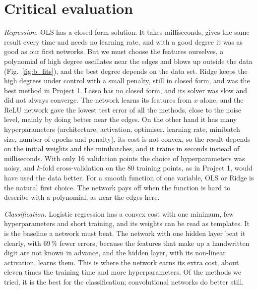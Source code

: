 
\section*{Critical evaluation}

\emph{Regression.} OLS has a closed-form solution. It takes milliseconds, gives the same result every time and needs no learning rate, and with a good degree it was as good as our first networks. But we must choose the features ourselves, a polynomial of high degree oscillates near the edges and blows up outside the data (Fig.~\ref{fig:b_fits}), and the best degree depends on the data set. Ridge keeps the high degrees under control with a small penalty, still in closed form, and was the best method in Project 1. Lasso has no closed form, and its solver was slow and did not always converge. The network learns its features from $x$ alone, and the ReLU network gave the lowest test error of all the methods, close to the noise level, mainly by doing better near the edges. On the other hand it has many hyperparameters (architecture, activation, optimiser, learning rate, minibatch size, number of epochs and penalty), its cost is not convex, so the result depends on the initial weights and the minibatches, and it trains in seconds instead of milliseconds. With only 16 validation points the choice of hyperparameters was noisy, and $k$-fold cross-validation on the 80 training points, as in Project 1, would have used the data better. For a smooth function of one variable, OLS or Ridge is the natural first choice. The network pays off when the function is hard to describe with a polynomial, as near the edges here.

\emph{Classification.} Logistic regression has a convex cost with one minimum, few hyperparameters and short training, and its weights can be read as templates. It is the baseline a network must beat. The network with one hidden layer beat it clearly, with 69\,\% fewer errors, because the features that make up a handwritten digit are not known in advance, and the hidden layer, with its non-linear activation, learns them. This is where the network earns its extra cost, about eleven times the training time and more hyperparameters. Of the methods we tried, it is the best for the classification; convolutional networks do better still.


